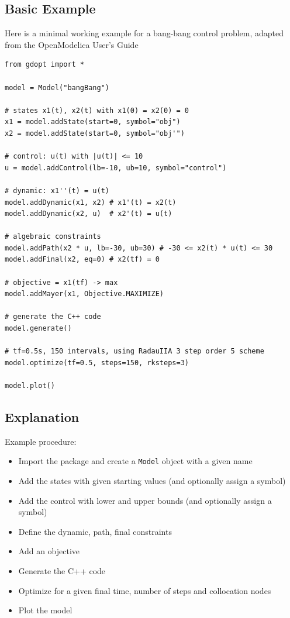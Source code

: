 \documentclass[12pt]{article}
\begin{document}
\subsection{Basic Example}
Here is a minimal working example for a bang-bang control problem, adapted from the OpenModelica User's Guide \cite{openmodelica}
\begin{lstlisting}
from gdopt import *

model = Model("bangBang")

# states x1(t), x2(t) with x1(0) = x2(0) = 0
x1 = model.addState(start=0, symbol="obj") 
x2 = model.addState(start=0, symbol="obj'")

# control: u(t) with |u(t)| <= 10
u = model.addControl(lb=-10, ub=10, symbol="control") 

# dynamic: x1''(t) = u(t)
model.addDynamic(x1, x2) # x1'(t) = x2(t)
model.addDynamic(x2, u)  # x2'(t) = u(t)

# algebraic constraints
model.addPath(x2 * u, lb=-30, ub=30) # -30 <= x2(t) * u(t) <= 30
model.addFinal(x2, eq=0) # x2(tf) = 0

# objective = x1(tf) -> max
model.addMayer(x1, Objective.MAXIMIZE) 

# generate the C++ code
model.generate() 

# tf=0.5s, 150 intervals, using RadauIIA 3 step order 5 scheme
model.optimize(tf=0.5, steps=150, rksteps=3)

model.plot()
	\end{lstlisting}

\subsection{Explanation}
Example procedure:
\begin{itemize}
	\item Import the package and create a \texttt{Model} object
	      with a given name
	\item Add the states with given starting values (and optionally
	      assign a symbol)
	\item Add the control with lower and upper bounds (and
	      optionally assign a symbol)
	\item Define the dynamic, path, final constraints
	\item Add an objective
	\item Generate the C++ code
	\item Optimize for a given final time, number of steps and
	      collocation nodes
	\item Plot the model
\end{itemize}
\end{document}
